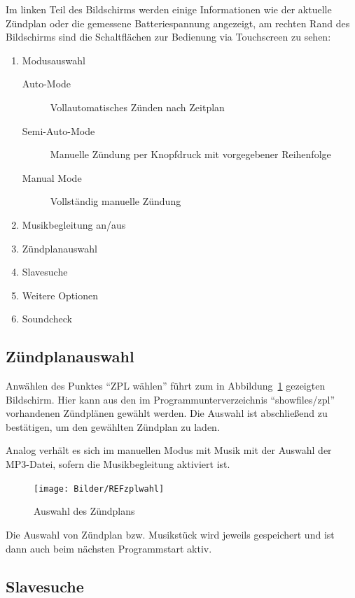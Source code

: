 \documentclass[paper=a4, parskip, numbers=noenddot, toc=listof, headsepline]{scrbook}
\begin{document}
			Im linken Teil des Bildschirms werden einige Informationen wie der aktuelle Zündplan oder die gemessene Batteriespannung angezeigt, am rechten Rand des Bildschirms sind die Schaltflächen zur Bedienung via Touchscreen zu sehen:
			\begin{enumerate}
				\item
				      Modusauswahl
				      \begin{description}
					      \item [Auto-Mode]
					            Vollautomatisches Zünden nach Zeitplan
					      \item [Semi-Auto-Mode]
					            Manuelle Zündung per Knopfdruck mit vorgegebener Reihenfolge
					      \item [Manual Mode]
					            Vollständig manuelle Zündung
				      \end{description}
				\item
				      Musikbegleitung an/aus
				\item
				      Zündplanauswahl
				\item
				      Slavesuche
				\item
				      Weitere Optionen
				\item
				      Soundcheck
			\end{enumerate}

			\subsection{Zündplanauswahl}

				Anwählen des Punktes \enquote{ZPL wählen} führt zum in Abbildung~\ref{fig:REFzplwahl} gezeigten Bildschirm. Hier kann aus den im Programmunterverzeichnis \enquote{showfiles/zpl} vorhandenen Zündplänen gewählt werden. Die Auswahl ist abschließend zu bestätigen, um den gewählten Zündplan zu laden.

				Analog verhält es sich im manuellen Modus mit Musik mit der Auswahl der MP3-Datei, sofern die Musikbegleitung aktiviert ist.

				\begin{figure}
					\centering\texttt{[image: Bilder/REFzplwahl]}
					\caption{Auswahl des Zündplans}
					\label{fig:REFzplwahl}
				\end{figure}

				Die Auswahl von Zündplan bzw. Musikstück wird jeweils gespeichert und ist dann auch beim nächsten Programmstart aktiv.

			\subsection{Slavesuche}
\end{document}
